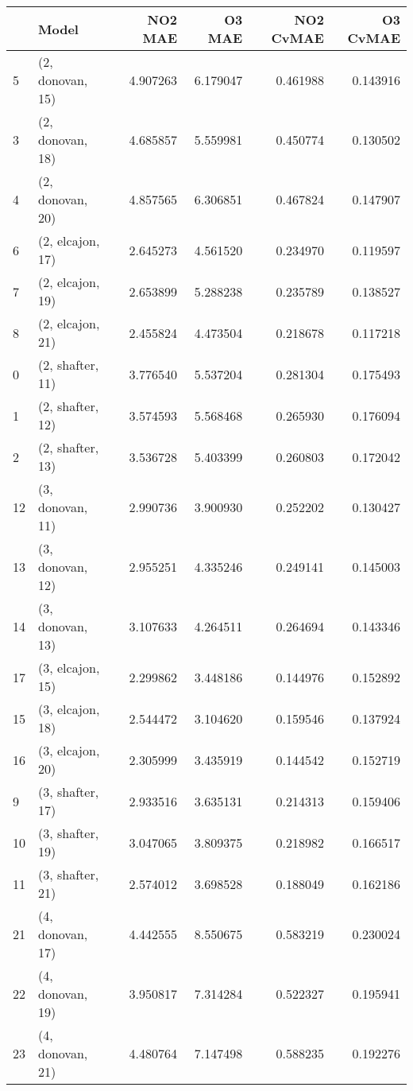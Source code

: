 \begin{tabular}{llrrrr}
\toprule
{} &             Model &    NO2 MAE &     O3 MAE &  NO2 CvMAE &  O3 CvMAE \\
\midrule
5  &  (2, donovan, 15) &   4.907263 &   6.179047 &   0.461988 &  0.143916 \\
3  &  (2, donovan, 18) &   4.685857 &   5.559981 &   0.450774 &  0.130502 \\
4  &  (2, donovan, 20) &   4.857565 &   6.306851 &   0.467824 &  0.147907 \\
6  &  (2, elcajon, 17) &   2.645273 &   4.561520 &   0.234970 &  0.119597 \\
7  &  (2, elcajon, 19) &   2.653899 &   5.288238 &   0.235789 &  0.138527 \\
8  &  (2, elcajon, 21) &   2.455824 &   4.473504 &   0.218678 &  0.117218 \\
0  &  (2, shafter, 11) &   3.776540 &   5.537204 &   0.281304 &  0.175493 \\
1  &  (2, shafter, 12) &   3.574593 &   5.568468 &   0.265930 &  0.176094 \\
2  &  (2, shafter, 13) &   3.536728 &   5.403399 &   0.260803 &  0.172042 \\
12 &  (3, donovan, 11) &   2.990736 &   3.900930 &   0.252202 &  0.130427 \\
13 &  (3, donovan, 12) &   2.955251 &   4.335246 &   0.249141 &  0.145003 \\
14 &  (3, donovan, 13) &   3.107633 &   4.264511 &   0.264694 &  0.143346 \\
17 &  (3, elcajon, 15) &   2.299862 &   3.448186 &   0.144976 &  0.152892 \\
15 &  (3, elcajon, 18) &   2.544472 &   3.104620 &   0.159546 &  0.137924 \\
16 &  (3, elcajon, 20) &   2.305999 &   3.435919 &   0.144542 &  0.152719 \\
9  &  (3, shafter, 17) &   2.933516 &   3.635131 &   0.214313 &  0.159406 \\
10 &  (3, shafter, 19) &   3.047065 &   3.809375 &   0.218982 &  0.166517 \\
11 &  (3, shafter, 21) &   2.574012 &   3.698528 &   0.188049 &  0.162186 \\
21 &  (4, donovan, 17) &   4.442555 &   8.550675 &   0.583219 &  0.230024 \\
22 &  (4, donovan, 19) &   3.950817 &   7.314284 &   0.522327 &  0.195941 \\
23 &  (4, donovan, 21) &   4.480764 &   7.147498 &   0.588235 &  0.192276 \\

\end{tabular}
